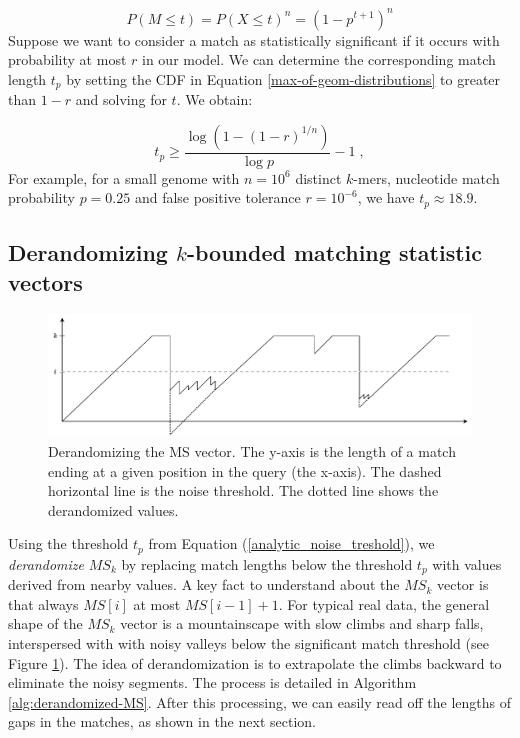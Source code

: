\documentclass[unnumsec,webpdf,contemporary,large]{oup-authoring-template}%
\theoremstyle{thmstyleone}%
\theoremstyle{thmstyletwo}%
\theoremstyle{thmstylethree}%
\begin{document}
\begin{equation}
    P\left(M \leq t\right) = P\left(X \leq t\right)^n = \left(1 - p^{t + 1}\right)^n
\label{max-of-geom-distributions}    
\end{equation}
Suppose we want to consider a match as statistically significant if it occurs with probability at most $r$ in our model. We can determine the corresponding match length $t_p$ by setting the CDF in Equation \ref{max-of-geom-distributions} to greater than $1-r$ and solving for $t$. We obtain:

\begin{equation}\label{analytic_noise_treshold}
t_p \geq \frac{\log (1 - (1-r)^{1/n})}{\log p} - 1\;,
\end{equation}
For example, for a small genome with $n = 10^6$ distinct $k$-mers,  nucleotide match probability $p = 0.25$ and false positive tolerance $r = 10^{-6}$, we have $t_p \approx 18.9$.

\subsection{\texorpdfstring{Derandomizing $k$-bounded matching statistic vectors}{Derandomizing k-bounded matching statistic vectors}}


\begin{figure}[b]
    \centering
    \includegraphics[width=1.0\linewidth]{fig/derandomized_MS.drawio.pdf}
    \caption{Derandomizing the MS vector. The y-axis is the length of a match ending at a given position in the query (the x-axis). The dashed horizontal line is the noise threshold. The dotted line shows the derandomized values. }
    \label{fig:derandomization}
\end{figure}
Using the threshold $t_p$ from Equation (\ref{analytic_noise_treshold}), we \emph{derandomize} $MS_k$ by replacing match lengths below the threshold $t_p$ with values derived from nearby values. A key fact to understand about the $MS_k$ vector is that always $MS[i]$ at most $MS[i-1]+1$. For typical real data, the general shape of the $MS_k$ vector is a mountainscape with slow climbs and sharp falls, interspersed with with noisy valleys below the significant match threshold (see Figure \ref{fig:derandomization}). The idea of derandomization is to extrapolate the climbs backward to eliminate the noisy segments. The process is detailed in Algorithm \ref{alg:derandomized-MS}. After this processing, we can easily read off the lengths of gaps in the matches, as shown in the next section.
\end{document}
